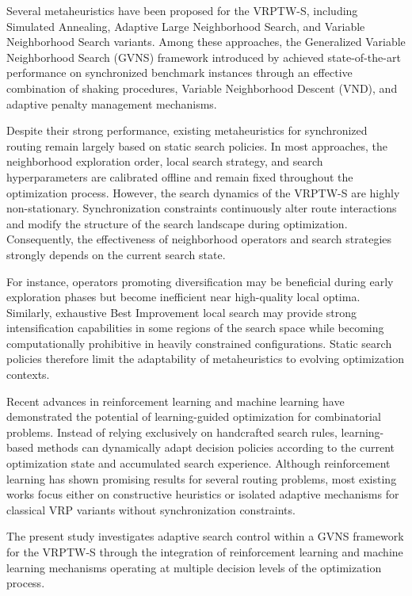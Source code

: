 \documentclass[preprint,12pt]{elsarticle}
\begin{document}
Several metaheuristics have been proposed for the VRPTW-S, including Simulated Annealing, Adaptive Large Neighborhood Search, and Variable Neighborhood Search variants. Among these approaches, the Generalized Variable Neighborhood Search (GVNS) framework introduced by \citet{masmoudi2025generalized} achieved state-of-the-art performance on synchronized benchmark instances through an effective combination of shaking procedures, Variable Neighborhood Descent (VND), and adaptive penalty management mechanisms.

Despite their strong performance, existing metaheuristics for synchronized routing remain largely based on static search policies. In most approaches, the neighborhood exploration order, local search strategy, and search hyperparameters are calibrated offline and remain fixed throughout the optimization process. However, the search dynamics of the VRPTW-S are highly non-stationary. Synchronization constraints continuously alter route interactions and modify the structure of the search landscape during optimization. Consequently, the effectiveness of neighborhood operators and search strategies strongly depends on the current search state.

For instance, operators promoting diversification may be beneficial during early exploration phases but become inefficient near high-quality local optima. Similarly, exhaustive Best Improvement local search may provide strong intensification capabilities in some regions of the search space while becoming computationally prohibitive in heavily constrained configurations. Static search policies therefore limit the adaptability of metaheuristics to evolving optimization contexts.

Recent advances in reinforcement learning and machine learning have demonstrated the potential of learning-guided optimization for combinatorial problems. Instead of relying exclusively on handcrafted search rules, learning-based methods can dynamically adapt decision policies according to the current optimization state and accumulated search experience. Although reinforcement learning has shown promising results for several routing problems, most existing works focus either on constructive heuristics or isolated adaptive mechanisms for classical VRP variants without synchronization constraints.

The present study investigates adaptive search control within a GVNS framework for the VRPTW-S through the integration of reinforcement learning and machine learning mechanisms operating at multiple decision levels of the optimization process.
\end{document}
